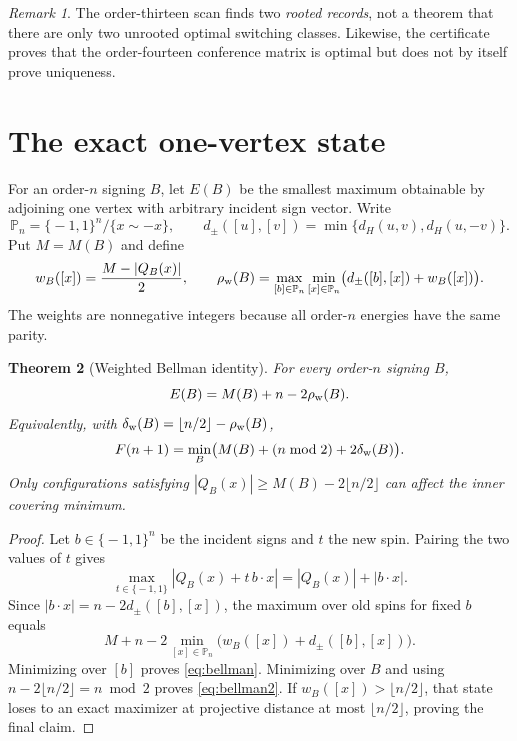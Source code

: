 \documentclass[11pt]{article}
\newcommand{\eps}{\{\!-1,1\!\}}
\newcommand{\PP}{\mathbb P}
\newtheorem{theorem}{Theorem}[section]
\theoremstyle{remark}
\newtheorem{remark}[theorem]{Remark}
\begin{document}
\begin{remark}
The order-thirteen scan finds two \emph{rooted records}, not a theorem that
there are only two unrooted optimal switching classes.  Likewise, the
certificate proves that the order-fourteen conference matrix is optimal but
does not by itself prove uniqueness.
\end{remark}

\section{The exact one-vertex state}

For an order-$n$ signing $B$, let $E(B)$ be the smallest maximum obtainable
by adjoining one vertex with arbitrary incident sign vector.  Write
\[
 \PP_n=\eps^n/\{x\sim-x\},
 \qquad d_\pm([u],[v])=\min\{d_H(u,v),d_H(u,-v)\}.
\]
Put $M=M(B)$ and define
\[
 w_B([x])=\frac{M-|Q_B(x)|}{2},
 \qquad
 \rho_{\rm w}(B)=\max_{[b]\in\PP_n}\min_{[x]\in\PP_n}
 \bigl(d_\pm([b],[x])+w_B([x])\bigr).
\]
The weights are nonnegative integers because all order-$n$ energies have the
same parity.

\begin{theorem}[Weighted Bellman identity]
For every order-$n$ signing $B$,
\begin{equation}
 E(B)=M(B)+n-2\rho_{\rm w}(B).                            \label{eq:bellman}
\end{equation}
Equivalently, with
$\delta_{\rm w}(B)=\lfloor n/2\rfloor-\rho_{\rm w}(B)$,
\begin{equation}
 F(n+1)=\min_B\bigl(M(B)+(n\bmod2)+2\delta_{\rm w}(B)\bigr).
                                                               \label{eq:bellman2}
\end{equation}
Only configurations satisfying
$|Q_B(x)|\ge M(B)-2\lfloor n/2\rfloor$ can affect the inner covering
minimum.
\end{theorem}

\begin{proof}
Let $b\in\eps^n$ be the incident signs and $t$ the new spin.  Pairing the two
values of $t$ gives
\[
 \max_{t\in\eps}|Q_B(x)+t\,b\cdot x|
   =|Q_B(x)|+|b\cdot x|.
\]
Since $|b\cdot x|=n-2d_\pm([b],[x])$, the maximum over old spins for fixed
$b$ equals
\[
 M+n-2\min_{[x]\in\PP_n}
       \bigl(w_B([x])+d_\pm([b],[x])\bigr).
\]
Minimizing over $[b]$ proves \eqref{eq:bellman}.  Minimizing over $B$ and
using $n-2\lfloor n/2\rfloor=n\bmod2$ proves \eqref{eq:bellman2}.
If $w_B([x])>\lfloor n/2\rfloor$, that state loses to an exact maximizer at
projective distance at most $\lfloor n/2\rfloor$, proving the final claim.
\end{proof}
\end{document}
